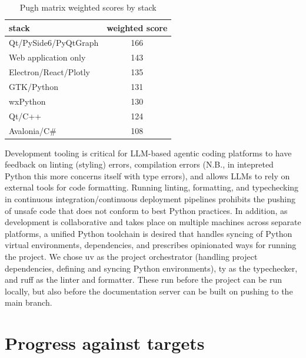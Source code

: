 \documentclass[10pt, a4paper]{article}
\begin{document}
\begin{table}[H]
  \small
  \centering
  \caption{Pugh matrix weighted scores by stack}
  \label{tab:pugh}
  \begin{tabularx}{\textwidth}{Xc}
    \toprule
    stack                 & weighted score \\
    \midrule
    Qt/PySide6/PyQtGraph  & 166            \\
    Web application only  & 143            \\
    Electron/React/Plotly & 135            \\
    GTK/Python            & 131            \\
    wxPython              & 130            \\
    Qt/C++                & 124            \\
    Avalonia/C\#          & 108            \\
    \bottomrule
  \end{tabularx}
\end{table}

Development tooling is critical for LLM-based agentic coding platforms to have feedback on linting (styling) errors, compilation errors (N.B., in intepreted Python this more concerns itself with type errors), and allows LLMs to rely on external tools for code formatting.
Running linting, formatting, and typechecking in continuous integration/continuous deployment pipelines prohibits the pushing of unsafe code that does not conform to best Python practices.
In addition, as development is collaborative and takes place on multiple machines across separate platforms, a unified Python toolchain is desired that handles syncing of Python virtual environments, dependencies, and prescribes opinionated ways for running the project.
We chose uv as the project orchestrator (handling project dependencies, defining and syncing Python environments), ty as the typechecker, and ruff as the linter and formatter.
These run before the project can be run locally, but also before the documentation server can be built on pushing to the main branch.

\section{Progress against targets}
\end{document}
